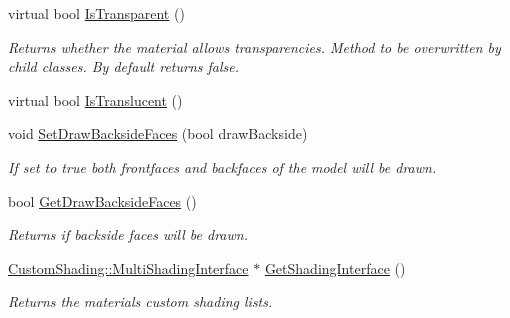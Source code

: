 \begin{DoxyCompactItemize}
\mbox{\label{class_geometry_engine_1_1_geometry_material_1_1_material_a63516b0a00dd39776f782ef0359b324e}} 
virtual bool \mbox{\hyperlink{class_geometry_engine_1_1_geometry_material_1_1_material_a63516b0a00dd39776f782ef0359b324e}{Is\+Transparent}} ()
\begin{DoxyCompactList}\small\item\em Returns whether the material allows transparencies. Method to be overwritten by child classes. By default returns false. \end{DoxyCompactList}\item 
virtual bool \mbox{\hyperlink{class_geometry_engine_1_1_geometry_material_1_1_material_ab8c9af9c6cbd2b4a8ad64f3a80702402}{Is\+Translucent}} ()
\item 
\mbox{\label{class_geometry_engine_1_1_geometry_material_1_1_material_a71103b83294e7c3752ecfe6cf4427e72}} 
void \mbox{\hyperlink{class_geometry_engine_1_1_geometry_material_1_1_material_a71103b83294e7c3752ecfe6cf4427e72}{Set\+Draw\+Backside\+Faces}} (bool draw\+Backside)
\begin{DoxyCompactList}\small\item\em If set to true both frontfaces and backfaces of the model will be drawn. \end{DoxyCompactList}\item 
\mbox{\label{class_geometry_engine_1_1_geometry_material_1_1_material_a85013da84d4416af919d1755706aeb13}} 
bool \mbox{\hyperlink{class_geometry_engine_1_1_geometry_material_1_1_material_a85013da84d4416af919d1755706aeb13}{Get\+Draw\+Backside\+Faces}} ()
\begin{DoxyCompactList}\small\item\em Returns if backside faces will be drawn. \end{DoxyCompactList}\item 
\mbox{\label{class_geometry_engine_1_1_geometry_material_1_1_material_ad6521f7fa23dff7348f6cee0e4a0d372}} 
\mbox{\hyperlink{class_geometry_engine_1_1_custom_shading_1_1_multi_shading_interface}{Custom\+Shading\+::\+Multi\+Shading\+Interface}} $\ast$ \mbox{\hyperlink{class_geometry_engine_1_1_geometry_material_1_1_material_ad6521f7fa23dff7348f6cee0e4a0d372}{Get\+Shading\+Interface}} ()
\begin{DoxyCompactList}\small\item\em Returns the material\textquotesingle{}s custom shading lists. \end{DoxyCompactList}\end{DoxyCompactItemize}
